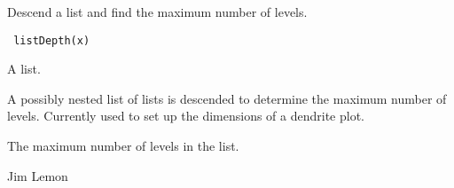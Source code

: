 \begin{Description}\relax
Descend a list and find the maximum number of levels.
\end{Description}
\begin{Usage}
\begin{verbatim} listDepth(x) \end{verbatim}
\end{Usage}
\begin{Arguments}
\begin{ldescription}
\item[\code{x}] A list.
\end{ldescription}
\end{Arguments}
\begin{Details}\relax
A possibly nested list of lists is descended to determine the maximum number
of levels. Currently used to set up the dimensions of a dendrite plot.
\end{Details}
\begin{Value}
The maximum number of levels in the list.
\end{Value}
\begin{Author}\relax
Jim Lemon
\end{Author}
\begin{SeeAlso}\relax
{}
\end{SeeAlso}

